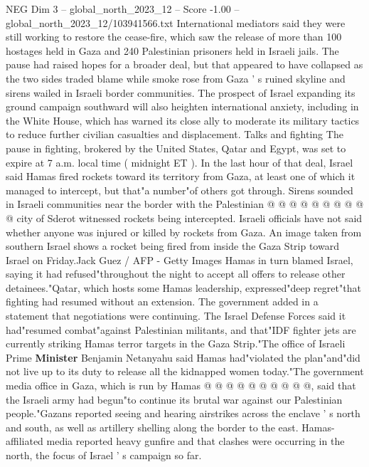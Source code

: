 \begin{textsample}{NEG Dim 3 – global\_north\_2023\_12 – Score -1.00 – global\_north\_2023\_12/103941566.txt}  \label{ex:f3_neg_232}
International mediators said they were still working to restore the cease-fire, which saw the release of more than 100 hostages held in Gaza and 240 Palestinian prisoners held in Israeli jails.
The pause had raised hopes for a broader deal, but that appeared to have collapsed as the two sides traded blame while smoke rose from Gaza ' s ruined skyline and sirens wailed in Israeli border communities.
The prospect of Israel expanding its ground campaign southward will also heighten international anxiety, including in the White House, which has warned its close ally to moderate its military tactics to reduce further civilian casualties and displacement.
Talks and fighting The pause in fighting, brokered by the United States, Qatar and Egypt, was set to expire at 7 a.m. local time ( midnight ET ).
In the last hour of that deal, Israel said Hamas fired rockets toward its territory from Gaza, at least one of which it managed to intercept, but that"a number"of others got through.
Sirens sounded in Israeli communities near the border with the Palestinian @ @ @ @ @ @ @ @ @ @ city of Sderot witnessed rockets being intercepted.
Israeli officials have not said whether anyone was injured or killed by rockets from Gaza.
An image taken from southern Israel shows a rocket being fired from inside the Gaza Strip toward Israel on Friday.Jack Guez / AFP - Getty Images Hamas in turn blamed Israel, saying it had refused"throughout the night to accept all offers to release other detainees."Qatar, which hosts some Hamas leadership, expressed"deep regret"that fighting had resumed without an extension.
The government added in a statement that negotiations were continuing.
The Israel Defense Forces said it had"resumed combat"against Palestinian militants, and that"IDF fighter jets are currently striking Hamas terror targets in the Gaza Strip."The office of Israeli Prime \textbf{Minister} Benjamin Netanyahu said Hamas had"violated the plan"and"did not live up to its duty to release all the kidnapped women today."The government media office in Gaza, which is run by Hamas @ @ @ @ @ @ @ @ @ @, said that the Israeli army had begun"to continue its brutal war against our Palestinian people."Gazans reported seeing and hearing airstrikes across the enclave ' s north and south, as well as artillery shelling along the border to the east.
Hamas-affiliated media reported heavy gunfire and that clashes were occurring in the north, the focus of Israel ' s campaign so far.

\end{textsample}
